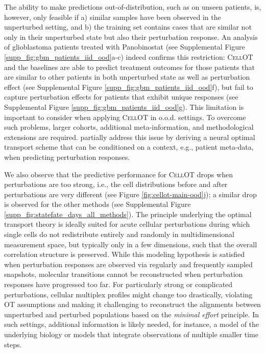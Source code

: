The ability to make predictions out-of-distribution, such as on unseen patients, is, however, only feasible if a) similar samples have been observed in the unperturbed setting, and b) the training set contains cases that are similar not only in their unperturbed state but also their perturbation response.
An analysis of glioblastoma patients treated with Panobinostat \cite{zhao2021} (see Supplemental Figure \ref{supp_fig:gbm_patients_iid_ood}a-c) indeed confirms this restriction:
\textsc{CellOT} and the baselines are able to predict treatment outcomes for those patients that are similar to other patients in both unperturbed state as well as perturbation effect (see Supplemental Figure \ref{supp_fig:gbm_patients_iid_ood}f), but fail to capture perturbation effects for patients that exhibit unique responses (see Supplemental Figure \ref{supp_fig:gbm_patients_iid_ood}g).
This limitation is important to consider when applying \textsc{CellOT} in o.o.d. settings. To overcome such problems, 
larger cohorts, additional meta-information, and methodological extensions are required. \citet{bunne2022} partially address this issue by deriving a neural optimal transport scheme that can be conditioned on a context, e.g., patient meta-data, when predicting perturbation responses.

We also observe that the predictive performance for \textsc{CellOT} drops when perturbations are too strong, i.e., the cell distributions before and after perturbations are very different (see Figure \ref{fig:cellot-main-ood}j); a similar drop is observed for the other methods (see Supplemental Figure \ref{supp_fig:statefate_days_all_methods}).
The principle underlying the optimal transport theory is ideally suited for acute cellular perturbations during which single cells do not redistribute entirely and randomly in multidimensional measurement space, but typically only in a few dimensions, such that the overall correlation structure is preserved. While this modeling hypothesis is satisfied when perturbation responses are observed via regularly and frequently sampled snapshots, molecular transitions cannot be reconstructed when perturbation responses have progressed too far. For particularly strong or complicated perturbations, cellular multiplex profiles might change too drastically, violating OT assumptions and making it challenging to reconstruct the alignments between unperturbed and perturbed populations based on the \emph{minimal effort} principle.
In such settings, additional information is likely needed, for instance, a model of the underlying biology or models that integrate observations of multiple smaller time steps. 

